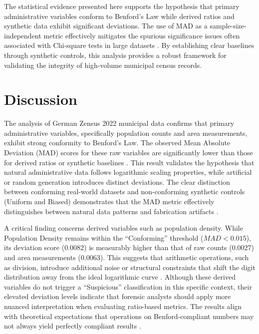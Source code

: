 \documentclass[11pt,a4paper]{article}
\begin{document}
The statistical evidence presented here supports the hypothesis that primary administrative variables conform to Benford's Law while derived ratios and synthetic data exhibit significant deviations. The use of MAD as a sample-size-independent metric effectively mitigates the spurious significance issues often associated with Chi-square tests in large datasets \cite{Kossovsky2021OnTM}. By establishing clear baselines through synthetic controls, this analysis provides a robust framework for validating the integrity of high-volume municipal census records.

\section{Discussion}
The analysis of German Zensus 2022 municipal data confirms that primary administrative variables, specifically population counts and area measurements, exhibit strong conformity to Benford's Law. The observed Mean Absolute Deviation (MAD) scores for these raw variables are significantly lower than those for derived ratios or synthetic baselines \cite{Druica2018BenfordsLA}. This result validates the hypothesis that natural administrative data follows logarithmic scaling properties, while artificial or random generation introduces distinct deviations. The clear distinction between conforming real-world datasets and non-conforming synthetic controls (Uniform and Biased) demonstrates that the MAD metric effectively distinguishes between natural data patterns and fabrication artifacts \cite{Petras2025DetectingBL}.

A critical finding concerns derived variables such as population density. While Population Density remains within the ``Conforming'' threshold ($MAD < 0.015$), its deviation score (0.0082) is measurably higher than that of raw counts (0.0027) and area measurements (0.0063). This suggests that arithmetic operations, such as division, introduce additional noise or structural constraints that shift the digit distribution away from the ideal logarithmic curve \cite{Druica2018BenfordsLA}. Although these derived variables do not trigger a ``Suspicious'' classification in this specific context, their elevated deviation levels indicate that forensic analysts should apply more nuanced interpretation when evaluating ratio-based metrics. The results align with theoretical expectations that operations on Benford-compliant numbers may not always yield perfectly compliant results \cite{Druica2018BenfordsLA}.
\end{document}
